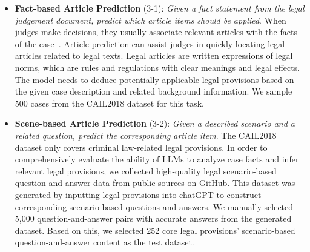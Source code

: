 \begin{itemize}
    \item \textbf{Fact-based Article Prediction} (3-1): \emph{Given a fact statement from the legal judgement document, predict which article items should be applied}.
When judges make decisions, they usually associate relevant articles with the facts of the case~\cite{ge2021learning,louis2023finding}. Article prediction can assist judges in quickly locating legal articles related to legal texts. Legal articles are written expressions of legal norms, which are rules and regulations with clear meanings and legal effects. 
The model needs to deduce potentially applicable legal provisions based on the given case description and related background information. We sample 500 cases from the CAIL2018 dataset for this task.

    \item \textbf{Scene-based Article Prediction} (3-2): \emph{Given a described scenario and a related question, predict the corresponding article item}.
The CAIL2018 dataset only covers criminal law-related legal provisions. In order to comprehensively evaluate the ability of LLMs to analyze case facts and infer relevant legal provisions, we collected high-quality legal scenario-based question-and-answer data from public sources on GitHub\cite{LAWGPT-zh}. This dataset was generated by inputting legal provisions into chatGPT to construct corresponding scenario-based questions and answers. We manually selected 5,000 question-and-answer pairs with accurate answers from the generated dataset. Based on this, we selected 252 core legal provisions' scenario-based question-and-answer content as the test dataset.


\end{itemize}

